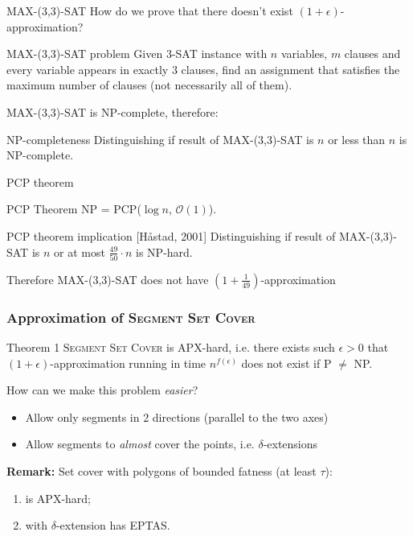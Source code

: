 \documentclass{beamer}
\begin{document}
\begin{frame}{\textsc{MAX-(3,3)-SAT}}
How do we prove that there doesn't exist $(1+\epsilon)$-approximation?


\begin{block}{\textsc{MAX-(3,3)-SAT} problem}
Given 3-SAT instance with $n$ variables, $m$ clauses
and every variable appears in exactly 3 clauses,
find an assignment
that satisfies the maximum number of clauses
(not necessarily all of them).
\end{block}

MAX-(3,3)-SAT is NP-complete, therefore:

\begin{block}{NP-completeness}
Distinguishing if result of MAX-(3,3)-SAT is
$n$ or less than $n$ is NP-complete.
\end{block}
\end{frame}

\begin{frame}{PCP theorem}
\begin{block}{PCP Theorem}
NP = PCP($\log n$, $\mathcal{O}(1)$).
\end{block}

\begin{block}{PCP theorem implication [Håstad, 2001]}
Distinguishing if result of MAX-(3,3)-SAT is $n$
or at most $\frac{49}{50} \cdot n$ is NP-hard.
\end{block}

Therefore MAX-(3,3)-SAT does not have
$(1+\frac{1}{49})$-approximation
\end{frame}


\begin{frame}
\frametitle{Approximation of \textsc{Segment Set Cover}}
\begin{block}{Theorem 1}
	\textsc{Segment Set Cover} is APX-hard, i.e.
	there exists such $\epsilon>0$
	that $(1+\epsilon)$-approximation 
	running in time $n^{f(\epsilon)}$ does not exist if P $\neq$ NP.
\end{block}

How can we make this problem \textit{easier}?
\begin{itemize}
\item Allow only segments in 2 directions (parallel to the two axes)
\item Allow segments to \textit{almost} cover the points, i.e. $\delta$-extensions
\end{itemize}

\pause

\bigskip

\textbf{Remark:}
	Set cover with polygons of bounded fatness (at least $\tau$):
	\begin{enumerate}
	\item is APX-hard;
	\item with $\delta$-extension has EPTAS.
	\end{enumerate}

\end{frame}
\end{document}
